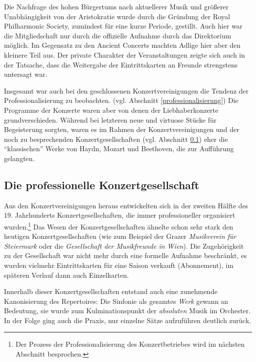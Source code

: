 \documentclass[a4paper, german, oneside]{scrbook}
\begin{document}
Die Nachfrage des hohen Bürgertums nach aktuellerer Musik und größerer Unabhängigkeit von der Aristokratie wurde durch die Gründung der Royal Philharmonic Society, zumindest für eine kurze Periode, gestillt. Auch hier war die Mitgliedschaft nur durch die offizielle Aufnahme durch das Direktorium möglich. Im Gegensatz zu den Ancient Concerts machten Adlige hier aber den kleinere Teil aus. Der private Charakter der Veranstaltungen zeigte sich auch in der Tatsache, dass die Weitergabe der Eintrittskarten an Freunde strengstens untersagt war. \parencite[vgl.][93]{muller_publikum_2014}

Insgesamt war auch bei den geschlossenen Konzertvereinigungen die Tendenz der Professionalisierung zu beobachten. (vgl. Abschnitt \ref{professionalisierung}) Die Programme der Konzerte waren aber von denen der Liebhaberkonzerte grundverschieden. Während bei letzteren neue und virtuose Stücke für Begeisterung sorgten, waren es im Rahmen der Konzertvereinigungen und der noch zu besprechenden Konzertgesellschaften (vgl. Abschnitt \ref{konzertgesellschaft}) eher die \enquote{klassischen} Werke von Haydn, Mozart und Beethoven, die zur Aufführung gelangten. \parencite[vgl.][22f]{weber_music_2004}


\subsection{Die professionelle Konzertgesellschaft}
\label{konzertgesellschaft}
Aus den Konzertvereinigungen heraus entwickelten sich in der zweiten Hälfte des 19. Jahrhunderts Konzertgesellschaften, die immer professioneller organisiert wurden.\footnote{Der Prozess der Professionalisierung des Konzertbetriebes wird im nächsten Abschnitt besprochen.} Das Wesen der Konzertgesellschaften ähnelte schon sehr stark den heutigen Konzertgesellschaften (wie zum Beispiel der Grazer \emph{Musikverein für Steiermark} oder die \emph{Gesellschaft der Musikfreunde in Wien}). Die Zugehörigkeit zu der Gesellschaft war nicht mehr durch eine formelle Aufnahme beschränkt, es wurden vielmehr Eintrittskarten für eine Saison verkauft (Abonnement), im späteren Verlauf dann auch Einzelkarten. \parencite[vgl.][106]{heister_konzert:_1983}

Innerhalb dieser Konzertgesellschaften entstand auch eine zunehmende Kanonisierung des Repertoires: Die Sinfonie als gesamtes \emph{Werk} gewann an Bedeutung, sie wurde zum Kulminationspunkt der \emph{absoluten} Musik im Orchester. In der Folge ging auch die Praxis, nur einzelne Sätze aufzuführen deutlich zurück. \parencite[vgl.][231ff.]{muller_publikum_2014}
\end{document}
